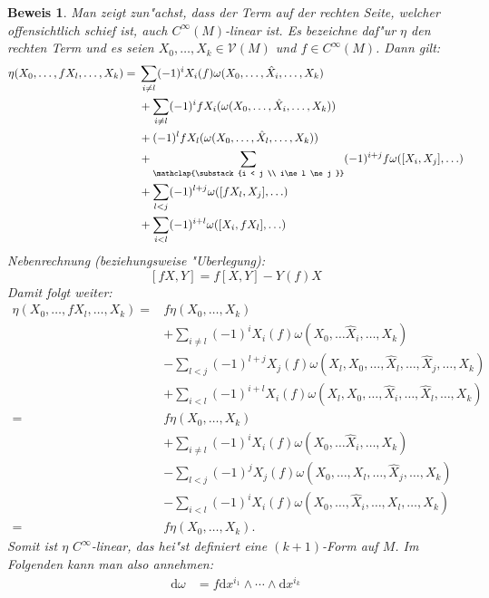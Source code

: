 \documentclass[paper=A4, twoside, chapterprefix=true, bibliography=totoc, headsepline]{scrbook}
\newcommand{\dop}{\mathrm{d}}
\theoremstyle{plain}
\theoremstyle{nonumberplain}
\newtheorem{bew}{Beweis}
\theoremstyle{empty}
\theoremstyle{break}
\begin{document}
\begin{bew}
Man zeigt zun"achst, dass der Term auf der rechten Seite, welcher offensichtlich schief ist, auch $C^{\infty}(M)$-linear ist.
Es bezeichne daf"ur $\eta$ den rechten Term und es seien $X_0, \ldots, X_k \in \mathcal V(M)$ und $f \in C^{\infty}(M)$. Dann gilt:
\begin{align*}
    \eta(X_0,\ldots,fX_l,\ldots, X_k) ={} & \sum_{i \neq l}(-1)^iX_i(f) \omega(X_0,\ldots, \hat X_i, \ldots, X_k)\\
& + \sum_{i \neq l}(-1)^ifX_i(\omega(X_0,\ldots, \hat X_i, \ldots, X_k))\\
& + (-1)^lfX_l(\omega(X_0, \ldots, \hat X_l, \ldots, X_k))\\ %
& + \sum_{\mathclap{\substack{i < j \\ i\ne l \ne j }}}(-1)^{i+j}f\omega([X_i,X_j], \ldots )\\ %
& + \sum_{l < j}(-1)^{l+j}\omega([fX_l,X_j], \ldots )\\
& + \sum_{i<l}(-1)^{i+l}\omega([X_i,fX_l], \ldots )
  \end{align*}
Nebenrechnung (beziehungsweise "Uberlegung):
	\[ [fX, Y] = f[X,Y] - Y(f)X \]
Damit folgt weiter:
\begin{align*}
	\eta(X_0,\ldots,fX_l,\ldots, X_k) ={} & f \eta(X_0,\ldots, X_k) \\
		& + \sum_{i\neq l} (-1)^i X_i(f)\omega(X_0, \ldots \hat X_i, \ldots, X_k)\\
		& - \sum_{l<j}(-1)^{l+j}X_j(f) \omega(X_l, X_0, \ldots, \hat X_l, \ldots, \hat X_j, \ldots, X_k)\\
		& + \sum_{i<l}(-1)^{i+l}X_i(f) \omega(X_l, X_0, \ldots, \hat X_i, \ldots, \hat X_l, \ldots, X_k)\\
	={} & f \eta(X_0,\ldots, X_k) \\
		& + \sum_{i\neq l} (-1)^i X_i(f)\omega(X_0, \ldots \hat X_i, \ldots, X_k)\\
		& - \sum_{l<j}(-1)^{j}X_j(f) \omega(X_0, \ldots, X_l, \ldots, \hat X_j, \ldots, X_k)\\
		& - \sum_{i<l}(-1)^{i}X_i(f) \omega(X_0, \ldots, \hat X_i, \ldots, X_l, \ldots, X_k)\\
	={} & f \eta(X_0,\ldots, X_k).
\end{align*}
Somit ist $\eta$ $C^{\infty}$-linear, das hei"st definiert eine $(k+1)$-Form auf $M$.
Im Folgenden kann man also annehmen:
\begin{align*}
	\dop \omega &= f \dop x^{i_1} \wedge \cdots \wedge \dop x^{i_k}\\

\end{align*}
\end{bew}
\end{document}
